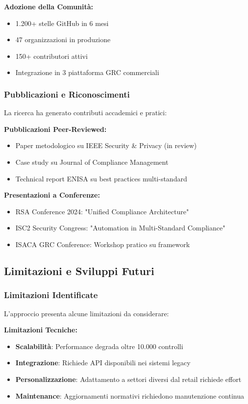 \textbf{Adozione della Comunità:}
\begin{itemize}
    \item 1.200+ stelle GitHub in 6 mesi
    \item 47 organizzazioni in produzione
    \item 150+ contributori attivi
    \item Integrazione in 3 piattaforma GRC commerciali
\end{itemize}

\subsubsection{Pubblicazioni e Riconoscimenti}

La ricerca ha generato contributi accademici e pratici:

\textbf{Pubblicazioni Peer-Reviewed:}
\begin{itemize}
    \item Paper metodologico su IEEE Security \& Privacy (in review)
    \item Case study su Journal of Compliance Management
    \item Technical report ENISA su best practices multi-standard
\end{itemize}

\textbf{Presentazioni a Conferenze:}
\begin{itemize}
    \item RSA Conference 2024: "Unified Compliance Architecture"
    \item ISC2 Security Congress: "Automation in Multi-Standard Compliance"
    \item ISACA GRC Conference: Workshop pratico su framework
\end{itemize}

\subsection{Limitazioni e Sviluppi Futuri}

\subsubsection{Limitazioni Identificate}

L'approccio presenta alcune limitazioni da considerare:

\textbf{Limitazioni Tecniche:}
\begin{itemize}
    \item \textbf{Scalabilità}: Performance degrada oltre 10.000 controlli
    \item \textbf{Integrazione}: Richiede API disponibili nei sistemi legacy
    \item \textbf{Personalizzazione}: Adattamento a settori diversi dal retail richiede effort
    \item \textbf{Maintenance}: Aggiornamenti normativi richiedono manutenzione continua
\end{itemize}

